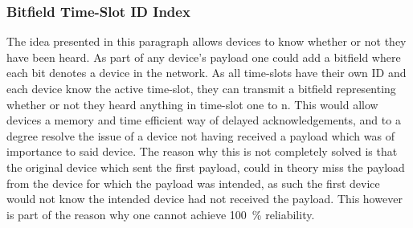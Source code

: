 \subsubsection*{Bitfield Time-Slot ID Index}
The idea presented in this paragraph allows devices to know whether or not they have been heard.
As part of any device's payload one could add a bitfield where each bit denotes a device in the network.
As all time-slots have their own ID and each device know the active time-slot, they can transmit a bitfield representing whether or not they heard anything in time-slot one to n.
This would allow devices a memory and time efficient way of delayed acknowledgements, and to a degree resolve the issue of a device not having received a payload which was of importance to said device.
The reason why this is not completely solved is that the original device which sent the first payload, could in theory miss the payload from the device for which the payload was intended, as such the first device would not know the intended device had not received the payload.
This however is part of the reason why one cannot achieve 100~\% reliability.
